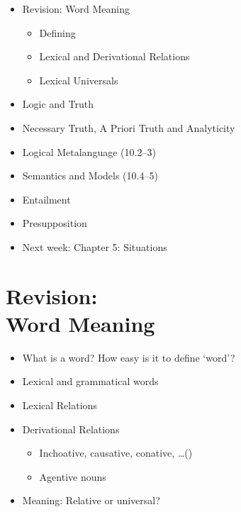 \documentclass[headrule,footrule]{foils}
\begin{document}
\maketitle

%


\begin{itemize}\addtolength{\itemsep}{-1ex}
\item Revision: Word Meaning
  \begin{itemize}
  \item Defining 
  \item Lexical  and Derivational Relations
  \item Lexical Universals
 \end{itemize}
\item Logic and Truth
\item Necessary Truth, A Priori Truth and Analyticity
\item Logical Metalanguage (10.2--3)
\item Semantics and Models (10.4--5)
\item Entailment
\item Presupposition
\item Next week: Chapter 5: Situations
\end{itemize}


\section{Revision: \\ Word Meaning}

\begin{itemize}
\item What is a word? How easy is it to define ‘word’?
\item Lexical and grammatical words
\item Lexical Relations
\item Derivational Relations
  \begin{itemize}
  \item Inchoative, causative, conative, \ldots ()
  \item Agentive nouns
  \end{itemize}
\item Meaning: Relative or universal?
\end{itemize}
\end{document}

